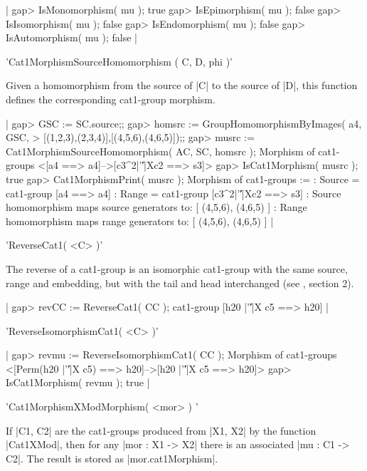 |    gap> IsMonomorphism( mu );
    true
    gap> IsEpimorphism( mu );
    false
    gap> IsIsomorphism( mu );
    false
    gap> IsEndomorphism( mu );
    false
    gap> IsAutomorphism( mu );
    false   |

%

'Cat1MorphismSourceHomomorphism ( C, D, phi )'

Given a homomorphism from the source of |C| to the source of |D|, this
function defines the corresponding cat1-group morphism.

|    gap> GSC := SC.source;;
    gap> homsrc := GroupHomomorphismByImages( a4, GSC,
    >                [(1,2,3),(2,3,4)],[(4,5,6),(4,6,5)]);;
    gap> musrc := Cat1MorphismSourceHomomorphism( AC, SC, homsrc );
    Morphism of cat1-groups <[a4 ==> a4]-->[c3^2|'\|'|Xc2 ==> s3]>
    gap> IsCat1Morphism( musrc );
    true
    gap> Cat1MorphismPrint( musrc );
    Morphism of cat1-groups := 
    : Source = cat1-group [a4 ==> a4] 
    :  Range = cat1-group [c3^2|'\|'|Xc2 ==> s3] 
    : Source homomorphism maps source generators to:
       [ (4,5,6), (4,6,5) ]
    : Range homomorphism maps range generators to:
       [ (4,5,6), (4,6,5) ]  |

%

'ReverseCat1( <C> )'

The reverse of a cat1-group is an  isomorphic cat1-group with the same
source,  range and embedding, but with  the tail and head interchanged
(see \cite{xmodAW1}, section 2).

|    gap> revCC := ReverseCat1( CC );
    cat1-group [h20 |'\|'|X c5 ==> h20]  |

%

'ReverseIsomorphismCat1( <C> )'

|    gap> revmu := ReverseIsomorphismCat1( CC );
    Morphism of cat1-groups
       <[Perm(h20 |'\|'|X c5) ==> h20]-->[h20 |'\|'|X c5 ==> h20]>
    gap> IsCat1Morphism( revmu );
    true  |

%

'Cat1MorphismXModMorphism( <mor> ) '

If |C1, C2| are the cat1-groups produced from |X1, X2| by the function
|Cat1XMod|, then for any |mor : X1 -> X2| there is an associated |mu :
C1 -> C2|.  The result is stored as |mor.cat1Morphism|.

